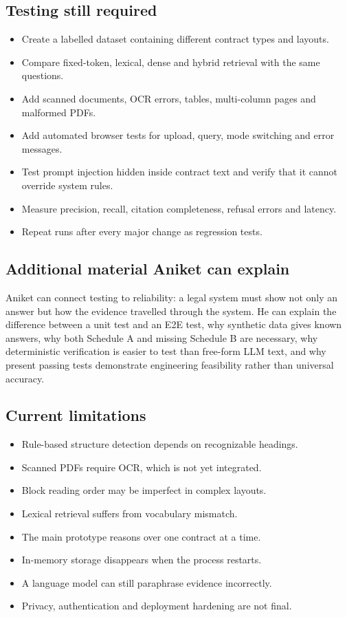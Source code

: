 \documentclass[11pt,letterpaper]{article}
\begin{document}
\subsection{Testing still required}
\begin{itemize}
  \item Create a labelled dataset containing different contract types and layouts.
  \item Compare fixed-token, lexical, dense and hybrid retrieval with the same questions.
  \item Add scanned documents, OCR errors, tables, multi-column pages and malformed PDFs.
  \item Add automated browser tests for upload, query, mode switching and error messages.
  \item Test prompt injection hidden inside contract text and verify that it cannot override system rules.
  \item Measure precision, recall, citation completeness, refusal errors and latency.
  \item Repeat runs after every major change as regression tests.
\end{itemize}

\subsection{Additional material Aniket can explain}
Aniket can connect testing to reliability: a legal system must show not only an answer but how the evidence travelled through the system. He can explain the difference between a unit test and an E2E test, why synthetic data gives known answers, why both Schedule A and missing Schedule B are necessary, why deterministic verification is easier to test than free-form LLM text, and why present passing tests demonstrate engineering feasibility rather than universal accuracy.

\subsection{Current limitations}
\begin{itemize}
  \item Rule-based structure detection depends on recognizable headings.
  \item Scanned PDFs require OCR, which is not yet integrated.
  \item Block reading order may be imperfect in complex layouts.
  \item Lexical retrieval suffers from vocabulary mismatch.
  \item The main prototype reasons over one contract at a time.
  \item In-memory storage disappears when the process restarts.
  \item A language model can still paraphrase evidence incorrectly.
  \item Privacy, authentication and deployment hardening are not final.
\end{itemize}
\end{document}
